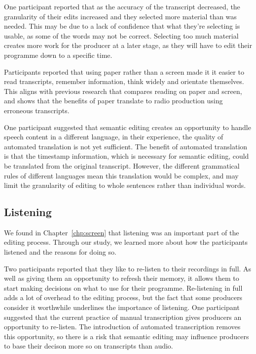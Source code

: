One participant reported that as the accuracy of the transcript decreased, the granularity of their edits increased
and they selected more material than was needed. This may be due to a lack of confidence that what they're selecting is
usable, as some of the words may not be correct. Selecting too much material creates more work for the producer at a
later stage, as they will have to edit their programme down to a specific time.

Participants reported that using paper rather than a screen made it it easier to read transcripts, remember
information, think widely and orientate themselves. This aligns with previous research that compares reading on paper
and screen, and shows that the benefits of paper translate to radio production using erroneous transcripts.

One participant suggested that semantic editing creates an opportunity to handle speech content in a different
language, in their experience, the quality of automated translation is not yet sufficient.  The benefit of automated
translation is that the timestamp information, which is necessary for semantic editing, could be translated from the
original transcript. However, the different grammatical rules of different languages mean this translation would be
complex, and may limit the granularity of editing to whole sentences rather than individual words.

\subsection{Listening}

We found in Chapter~\ref{chp:screen} that listening was an important part of the editing process. Through our study, we
learned more about how the participants listened and the reasons for doing so.

Two participants reported that they like to re-listen to their recordings in full. As well as giving them an
opportunity to refresh their memory, it allows them to start making decisions on what to use for their programme.
Re-listening in full adds a lot of overhead to the editing process, but the fact that some producers consider it
worthwhile underlines the importance of listening. One participant suggested that the current practice of manual
transcription gives producers an opportunity to re-listen. The introduction of automated transcription removes this
opportunity, so there is a risk that semantic editing may influence producers to base their decison more so on
transcripts than audio.

